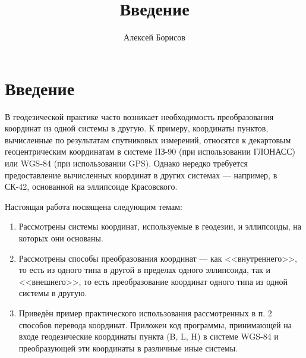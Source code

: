 \documentclass[12pt]{report}
\title{Введение}
\author{Алексей Борисов}
\begin{document}
\chapter*{Введение}
В геодезической практике часто возникает необходимость преобразования координат из одной системы в другую. К примеру, координаты пунктов, вычисленные по результатам спутниковых измерений, относятся к декартовым геоцентрическим координатам в системе ПЗ-90 (при использовании ГЛОНАСС) или WGS-84 (при использовании GPS). Однако нередко требуется предоставление вычисленных координат в других системах --- например, в СК-42, основанной на эллипсоиде Красовского.
\par
Настоящая работа посвящена следующим темам:
\begin{enumerate}
\item Рассмотрены системы координат, используемые в геодезии, и эллипсоиды, на которых они основаны.
\item Рассмотрены способы преобразования координат --- как <<внутреннего>>, то есть из одного типа в другой в пределах одного эллипсоида, так и <<внешнего>>, то есть преобразование координат одного типа из одной системы в другую. 
\item Приведён пример практического использования рассмотренных в п. 2 способов перевода координат. Приложен код программы, принимающей на входе геодезические координаты пункта (B, L, H) в системе WGS-84 и преобразующей эти координаты в различные иные системы. 
\end{enumerate}
\end{document}
